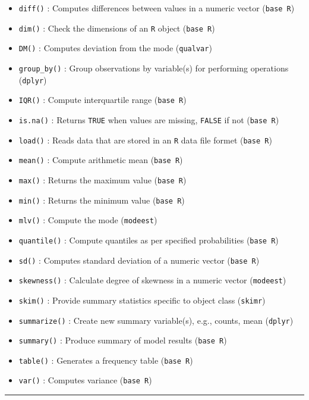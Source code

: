 \documentclass[
]{book}
\providecommand{\tightlist}{%
  \setlength{\itemsep}{0pt}\setlength{\parskip}{0pt}}
\begin{document}
\begin{itemize}
\tightlist
\item
  \texttt{diff()} : Computes differences between values in a numeric vector (\texttt{base\ R})
\item
  \texttt{dim()} : Check the dimensions of an \texttt{R} object (\texttt{base\ R})
\item
  \texttt{DM()} : Computes deviation from the mode (\texttt{qualvar})
\item
  \texttt{group\_by()} : Group observations by variable(s) for performing operations (\texttt{dplyr})
\item
  \texttt{IQR()} : Compute interquartile range (\texttt{base\ R})
\item
  \texttt{is.na()} : Returns \texttt{TRUE} when values are missing, \texttt{FALSE} if not (\texttt{base\ R})
\item
  \texttt{load()} : Reads data that are stored in an \texttt{R} data file formet (\texttt{base\ R})
\item
  \texttt{mean()} : Compute arithmetic mean (\texttt{base\ R})
\item
  \texttt{max()} : Returns the maximum value (\texttt{base\ R})
\item
  \texttt{min()} : Returns the minimum value (\texttt{base\ R})
\item
  \texttt{mlv()} : Compute the mode (\texttt{modeest})
\item
  \texttt{quantile()} : Compute quantiles as per specified probabilities (\texttt{base\ R})
\item
  \texttt{sd()} : Computes standard deviation of a numeric vector (\texttt{base\ R})
\item
  \texttt{skewness()} : Calculate degree of skewness in a numeric vector (\texttt{modeest})
\item
  \texttt{skim()} : Provide summary statistics specific to object class (\texttt{skimr})
\item
  \texttt{summarize()} : Create new summary variable(s), e.g., counts, mean (\texttt{dplyr})
\item
  \texttt{summary()} : Produce summary of model results (\texttt{base\ R})
\item
  \texttt{table()} : Generates a frequency table (\texttt{base\ R})
\item
  \texttt{var()} : Computes variance (\texttt{base\ R})
\end{itemize}

\begin{center}\rule{0.5\linewidth}{0.5pt}\end{center}
\end{document}
